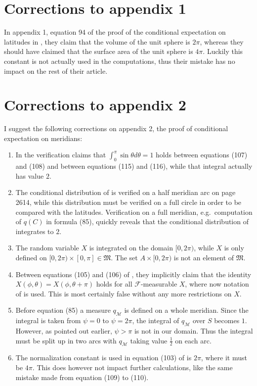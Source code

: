 \documentclass[a4paper]{report}
\theoremstyle{plain}
\theoremstyle{definition}
\theoremstyle{remark}
\numberwithin{equation}{chapter}
\DeclareMathOperator{\1}{\mathbbm{1}}
\newcommand{\F}{\mathcal{F}}
\begin{document}
\section{Corrections to appendix 1}\label{app:CorLong}
In appendix 1, equation 94 of the proof of the conditional expectation on latitudes in \cite{Gyenis17}, they claim that the volume of the unit sphere is $2\pi$, whereas they should have claimed that the surface area of the unit sphere is $4\pi$. Luckily this constant is not actually used in the computations, thus their mistake has no impact on the rest of their article.

\section{Corrections to appendix 2}\label{app:CorMer}
I suggest the following corrections on appendix 2, the proof of conditional expectation on meridians:
\begin{enumerate}
\item In the verification \cite{Gyenis17} claims that $\int_0^\pi\sin\theta d\theta=1$ holds between equations (107) and (108) and between equations (115) and (116), while that integral actually has value $2$.
\item The conditional distribution of \cite{Gyenis17} is verified on a half meridian arc on page 2614, while this distribution must be verified on a full circle in order to be compared with the latitudes. Verification on a full meridian, e.g.~computation of $q(C)$ in formula (85), quickly reveals that the conditional distribution of \cite{Gyenis17} integrates to $2$.
\item The random variable $X$ is integrated on the domain $[0,2\pi)$, while $X$ is only defined on $[0,2\pi)\times[0,\pi]\in\mathfrak{M}$. The set $A\times[0,2\pi)$ is not an element of $\mathfrak{M}$.
\item Between equations (105) and (106) of \cite{Gyenis17}, they implicitly claim that the identity $X(\phi,\theta)=X(\phi,\theta+\pi)$ holds for all $\F$-measurable $X$, where now notation of \cite{Gyenis17} is used. This is most certainly false without any more restrictions on $X$.
\item Before equation (85) a measure $q_\mathcal{M}$ is defined on a whole meridian. Since the integral is taken from $\psi=0$ to $\psi=2\pi$, the integral of $q_\mathcal{M}$ over $S$ becomes $1$. However, as pointed out earlier, $\psi>\pi$ is not in our domain. Thus the integral must be split up in two arcs with $q_{\mathcal{M}}$ taking value $\frac{1}{2}$ on each arc.
\item The normalization constant is used in equation (103) of \cite{Gyenis17} is $2\pi$, where it must be $4\pi$. This does however not impact further calculations, like the same mistake made from equation (109) to (110).
\end{enumerate}

\newpage

\printindex
\end{document}
